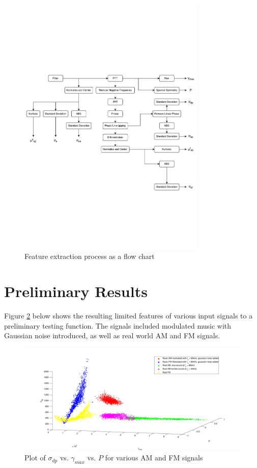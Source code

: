 \documentclass[10pt,twocolumn]{witseiepaper}
\begin{document}
\begin{figure}[h!]
	\centering
	\includegraphics[trim=0cm 10cm 0cm 11cm, clip=true,width=0.8\textwidth]{large.pdf}
	\caption{Feature extraction process as a flow chart}
	\label{fig:feature}
\end{figure}

\newpage
\section{Preliminary Results}
\label{app:prelim}
Figure \ref{fig:prelim} below shows the resulting limited features of various input signals to a preliminary testing function. The signals included modulated music with Gaussian noise introduced, as well as real world AM and FM signals.
\begin{figure}[!h]
	\centering
	\includegraphics[width=1.1\textwidth]{plot0-eps-converted-to.pdf}
	\caption{Plot of $\sigma_{dp}$ vs. $\gamma_{max}$ vs. $P$ for various AM and FM signals}
	\label{fig:prelim}
\end{figure}
\end{document}
